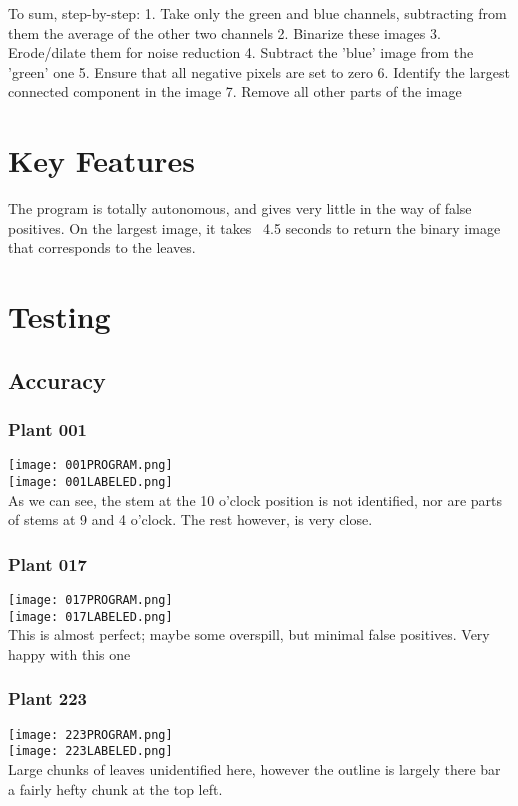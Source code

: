 \documentclass[12pt]{article}
\begin{document}
To sum, step-by-step:
  1. Take only the green and blue channels, subtracting from them the average of the other two channels
  2. Binarize these images
  3. Erode/dilate them for noise reduction
  4. Subtract the 'blue' image from the 'green' one
  5. Ensure that all negative pixels are set to zero
  6. Identify the largest connected component in the image
  7. Remove all other parts of the image

\section{Key Features}
The program is totally autonomous, and gives very little in the way of false positives.
On the largest image, it takes ~4.5 seconds to return the binary image that corresponds to the leaves.

\section{Testing}
\subsection{Accuracy}
\subsubsection{Plant 001}
\texttt{[image: 001PROGRAM.png]}\\
\texttt{[image: 001LABELED.png]}\\
As we can see, the stem at the 10 o'clock position is not identified, nor are parts of stems at 9 and 4 o'clock. The rest however, is very close.

\subsubsection{Plant 017}
\texttt{[image: 017PROGRAM.png]}\\
\texttt{[image: 017LABELED.png]}\\
This is almost perfect; maybe some overspill, but minimal false positives. Very happy with this one

\subsubsection{Plant 223}
\texttt{[image: 223PROGRAM.png]}\\
\texttt{[image: 223LABELED.png]}\\
Large chunks of leaves unidentified here, however the outline is largely there bar a fairly hefty chunk at the top left.
\end{document}
